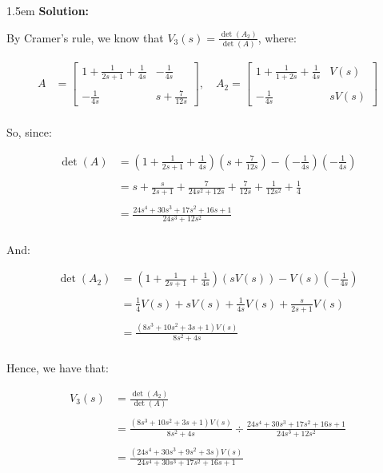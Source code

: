 \documentclass{article}
\newenvironment{solution}{
	\vspace{.5em}
	\par
	\begin{adjustwidth}{1.5em}{}
	\textbf{{Solution:}}
	\par
	\vspace{.5em}
}{
	\vspace{1em}
	\end{adjustwidth}
}
\begin{document}
\begin{solution}
	By Cramer's rule, we know that $V_3(s) = \frac{\det(A_2)}{\det(A)}$, where:

	\begin{align*}
		A &= \begin{bmatrix} 1 + \tfrac{1}{2s + 1} + \tfrac{1}{4s} & -\tfrac{1}{4s} \\\\ -\tfrac{1}{4s} & s + \tfrac{7}{12s} \end{bmatrix}, \quad A_2 = \begin{bmatrix} 1 + \tfrac{1}{1+2s} + \tfrac{1}{4s} & V(s) \\\\ -\tfrac{1}{4s} & sV(s) \end{bmatrix} \\
	\end{align*}

	So, since:

	\begin{align*}
		\det(A) &= \left(1 + \frac{1}{2s + 1} + \frac{1}{4s} \right)\left( s + \frac{7}{12s} \right) - \left( -\frac{1}{4s} \right)\left( -\frac{1}{4s} \right) \\\\
			&= s + \frac{s}{2s + 1} + \frac{7}{24s^2 + 12s} + \frac{7}{12s} + \frac{1}{12s^2} + \frac{1}{4} \\\\
			&= \frac{24s^4 + 30s^3 + 17s^2 + 16s + 1}{24s^3 + 12s^2} \\
	\end{align*}

	And:

	\begin{align*}
		\det(A_2) &= \left( 1 + \frac{1}{2s + 1} + \frac{1}{4s} \right)(sV(s)) - V(s)\left( -\frac{1}{4s} \right) \\\\
			&= \frac{1}{4}V(s) + sV(s) + \frac{1}{4s}V(s) + \frac{s}{2s + 1}V(s) \\\\
			&= \frac{\left( 8s^3 + 10s^2 + 3s + 1 \right)V(s)}{8s^2 + 4s} \\
	\end{align*}

	Hence, we have that:

	\begin{align*}
		V_3(s) &= \frac{\det(A_2)}{\det(A)} \\\\
			&= \frac{\left(8s^3 + 10s^2 + 3s + 1 \right)V(s)}{8s^2 + 4s} \div \frac{24s^4 + 30s^3 + 17s^2 + 16s + 1}{24s^3 + 12s^2} \\\\
			&= \frac{\left(24s^4 + 30s^3 + 9s^2 + 3s \right)V(s)}{24s^4 + 30s^3 + 17s^2 + 16s + 1} \\
	\end{align*}


\end{solution}
\end{document}
